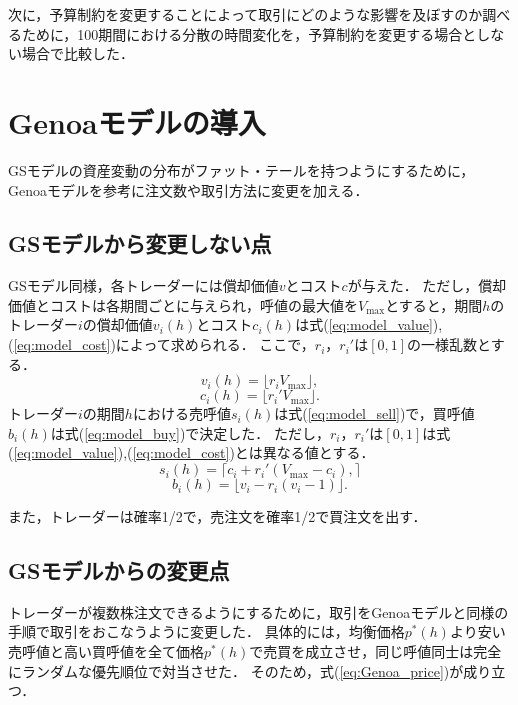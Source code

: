 \documentclass[titlepage]{jsreport}
\begin{document}
次に，予算制約を変更することによって取引にどのような影響を及ぼすのか調べるために，100期間における分散の時間変化を，予算制約を変更する場合としない場合で比較した．

\section{Genoaモデルの導入}
GSモデルの資産変動の分布がファット・テールを持つようにするために，Genoaモデルを参考に注文数や取引方法に変更を加える．

\subsection{GSモデルから変更しない点}
GSモデル同様，各トレーダーには償却価値$v$とコスト$c$が与えた．
ただし，償却価値とコストは各期間ごとに与えられ，呼値の最大値を$V_\mathrm{max}$とすると，期間$h$のトレーダー$i$の償却価値$v_i(h)$とコスト$c_i(h)$は式(\ref{eq:model_value}),(\ref{eq:model_cost})によって求められる．
ここで，$r_i$，$r_i'$は$[0, 1]$の一様乱数とする．
\begin{equation}
    v_i(h) = \lfloor r_i V_\mathrm{max} \rfloor, \label{eq:model_value}
\end{equation}
\begin{equation}
    c_i(h) = \lfloor r_i' V_\mathrm{max} \rfloor. \label{eq:model_cost}
\end{equation}
トレーダー$i$の期間$h$における売呼値$s_i(h)$は式(\ref{eq:model_sell})で，買呼値$b_i(h)$は式(\ref{eq:model_buy})で決定した．
ただし，$r_i$，$r_i'$は$[0, 1]$は式(\ref{eq:model_value}),(\ref{eq:model_cost})とは異なる値とする．
\begin{equation}
    s_i(h) = \lceil c_i + r_i' (V_\mathrm{max} - c_i), \rceil \label{eq:model_sell}
\end{equation}
\begin{equation}
    b_i(h) = \lfloor v_i - r_i (v_i - 1) \rfloor. \label{eq:model_buy}
\end{equation}

また，トレーダーは確率1/2で，売注文を確率1/2で買注文を出す．

\subsection{GSモデルからの変更点}
トレーダーが複数株注文できるようにするために，取引をGenoaモデルと同様の手順で取引をおこなうように変更した．
具体的には，均衡価格$p^*(h)$より安い売呼値と高い買呼値を全て価格$p^*(h)$で売買を成立させ，同じ呼値同士は完全にランダムな優先順位で対当させた．
そのため，式(\ref{eq:Genoa_price})が成り立つ．
\end{document}
